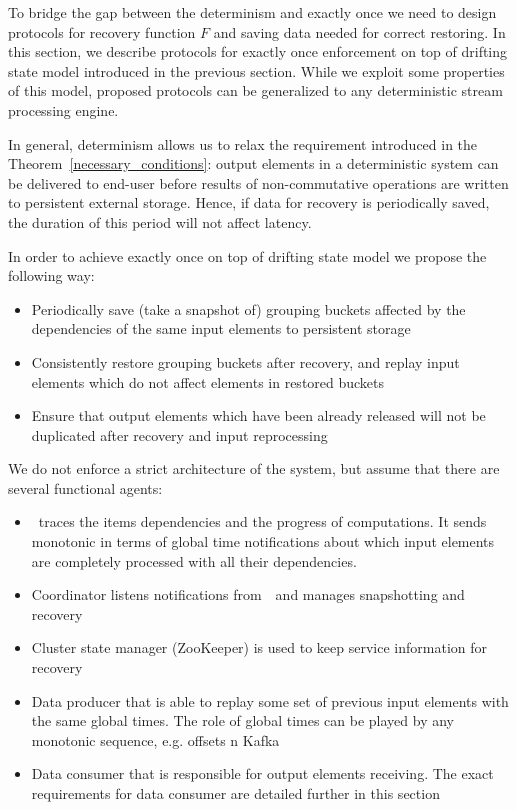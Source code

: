 
\label {fs-consistency-section}

To bridge the gap between the determinism and exactly once we need to design protocols for recovery function $F$ and saving data needed for correct restoring. In this section, we describe protocols for exactly once enforcement on top of drifting state model introduced in the previous section. While we exploit some properties of this model, proposed protocols can be generalized to any deterministic stream processing engine.

In general, determinism allows us to relax the requirement introduced in the Theorem~\ref{necessary_conditions}: output elements in a deterministic system can be delivered to end-user before results of non-commutative operations are written to persistent external storage. Hence, if data for recovery is periodically saved, the duration of this period will not affect latency.

In order to achieve exactly once on top of drifting state model we propose the following way:
\begin{itemize}
    \item Periodically save (take a snapshot of) grouping buckets affected by the dependencies of the same input elements to persistent storage
    \item Consistently restore grouping buckets after recovery, and replay input elements which do not affect elements in restored buckets
    \item Ensure that output elements which have been already released will not be duplicated after recovery and input reprocessing
\end{itemize}

We do not enforce a strict architecture of the system, but assume that there are several functional agents:
\begin{itemize}
    \item \Acker\ traces the items dependencies and the progress of computations. It sends monotonic in terms of global time notifications about which input elements are completely processed with all their dependencies.
    \item Coordinator listens notifications from~\Acker\ and manages snapshotting and recovery
    \item Cluster state manager (ZooKeeper) is used to keep service information for recovery
    \item Data producer that is able to replay some set of previous input elements with the same global times. The role of global times can be played by any monotonic sequence, e.g. offsets n Kafka
    \item Data consumer that is responsible for output elements receiving. The exact requirements for data consumer are detailed further in this section
\end{itemize}

